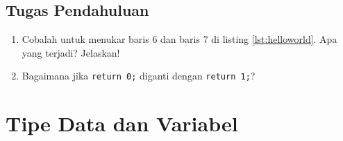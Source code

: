 \begin{itemize}
\end{itemize}
\subsection{Tugas Pendahuluan}
\begin{enumerate}
	\item Cobalah untuk menukar baris 6 dan baris 7 di listing \ref{lst:helloworld}. Apa yang terjadi? Jelaskan!
	\item Bagaimana jika \verb|return 0;| diganti dengan \verb|return 1;|?
\end{enumerate}


\section{Tipe Data dan Variabel}
